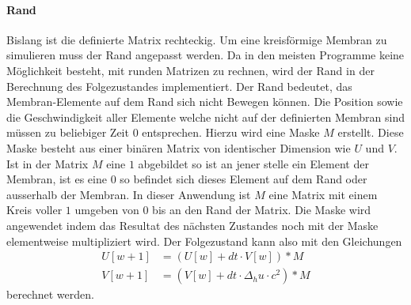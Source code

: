 \paragraph{Rand}
Bislang ist die definierte Matrix rechteckig.
Um eine kreisförmige Membran zu simulieren muss der Rand angepasst werden.
Da in den meisten Programme keine Möglichkeit besteht, mit runden Matrizen zu rechnen, wird der Rand in der Berechnung des Folgezustandes implementiert.
Der Rand bedeutet, das Membran-Elemente auf dem Rand sich nicht Bewegen können.
Die Position sowie die Geschwindigkeit aller Elemente welche nicht auf der definierten Membran sind müssen zu beliebiger Zeit $0$ entsprechen.
Hierzu wird eine Maske $M$ erstellt. 
Diese Maske besteht aus einer binären Matrix von identischer Dimension wie $ U $ und $ V $. 
Ist in der Matrix $M$ eine $1$ abgebildet so ist an jener stelle ein Element der Membran, ist es eine $0$ so befindet sich dieses Element auf dem Rand oder ausserhalb der Membran.
In dieser Anwendung ist $M$ eine Matrix mit einem Kreis voller $1$ umgeben von $0$ bis an den Rand der Matrix.
Die Maske wird angewendet indem das Resultat des nächsten Zustandes noch mit der Maske elementweise multipliziert wird. 
Der Folgezustand kann also mit den Gleichungen
\begin{align}
	\label{kreismembran:eq:folge_U} 
	U[w+1] &= (U[w] + dt \cdot V[w])*M\\
	\label{kreismembran:eq:folge_V}
	V[w+1] &= (V[w] + dt \cdot \Delta_h u \cdot c^2)*M
\end{align}
berechnet werden.
